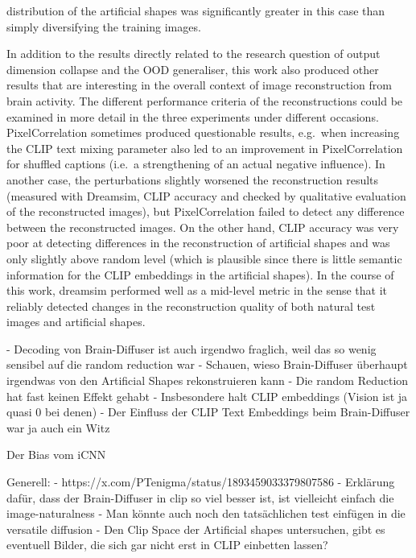 distribution of the artificial shapes was significantly greater in this case than simply diversifying the training images.

In addition to the results directly related to the research question of output dimension collapse and the OOD generaliser, this work also produced other results that are interesting in the overall context of image reconstruction from brain activity. The different performance criteria of the reconstructions could be examined in more detail in the three experiments under different occasions. PixelCorrelation sometimes produced questionable results, e.g.\ when increasing the CLIP text mixing parameter also led to an improvement in PixelCorrelation for shuffled captions (i.e.\ a strengthening of an actual negative influence). In another case, the perturbations slightly worsened the reconstruction results (measured with Dreamsim, CLIP accuracy and checked by qualitative evaluation of the reconstructed images), but PixelCorrelation failed to detect any difference between the reconstructed images. On the other hand, CLIP accuracy was very poor at detecting differences in the reconstruction of artificial shapes and was only slightly above random level (which is plausible since there is little semantic information for the CLIP embeddings in the artificial shapes). In the course of this work, dreamsim performed well as a mid-level metric in the sense that it reliably detected changes in the reconstruction quality of both natural test images and artificial shapes.


- Decoding von Brain-Diffuser ist auch irgendwo fraglich, weil das so wenig sensibel auf die random reduction war
    - Schauen, wieso Brain-Diffuser überhaupt irgendwas von den Artificial Shapes rekonstruieren kann
    - Die random Reduction hat fast keinen Effekt gehabt
    - Insbesondere halt CLIP embeddings (Vision ist ja quasi 0 bei denen)
- Der Einfluss der CLIP Text Embeddings beim Brain-Diffuser war ja auch ein Witz

Der Bias vom iCNN

Generell:
- https://x.com/PTenigma/status/1893459033379807586
- Erklärung dafür, dass der Brain-Diffuser in clip so viel besser ist, ist vielleicht einfach die image-naturalness
- Man könnte auch noch den tatsächlichen test einfügen in die versatile diffusion
- Den Clip Space der Artificial shapes untersuchen, gibt es eventuell Bilder, die sich gar nicht erst in CLIP einbetten lassen?

